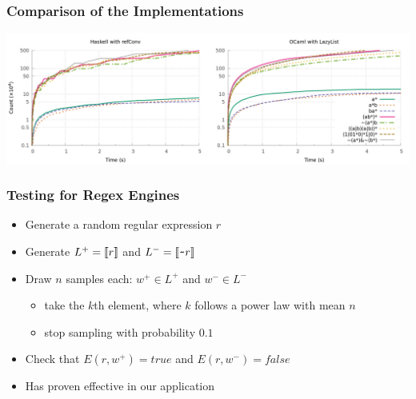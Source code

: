 \documentclass[pdftex,aspectratio=169]{beamer}
\begin{document}
\begin{frame}
  \frametitle{Comparison of the Implementations}
  \begin{center}
    \includegraphics[scale=0.2]{../measure/langs.png}
  \end{center}
\end{frame}
\begin{frame}
  \frametitle{Testing for Regex Engines}
  \begin{itemize}
  \item Generate a random regular expression $r$
  \item Generate $L^+ = \llbracket r\rrbracket$ and $L^- = \llbracket\texttt{\textasciitilde} r\rrbracket$
  \item Draw $n$ samples each: $w^+ \in L^+$ and $w^- \in L^-$
    \begin{itemize}
    \item take the $k$th element, where $k$ follows a power law with mean $n$
    \item stop sampling with probability $0.1$
    \end{itemize}
  \item Check that $E(r, w^+)=true$ and $E(r,w^-)=false$
  \item Has proven effective in our application
  \end{itemize}
\end{frame}
\end{document}
